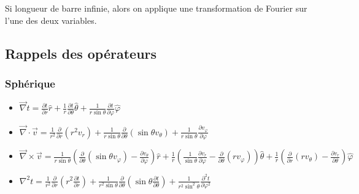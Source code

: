 \documentclass[../main.tex]{subfiles}
\begin{document}
Si longueur de barre infinie, alors on applique une transformation de Fourier sur l'une des deux variables.\\

\subsection{Rappels des opérateurs}
\subsubsection{Sphérique}
\begin{itemize}
    \item $\Vec{\nabla} t = \frac{\partial t}{\partial r} \hat{r} + \frac{1}{r} \frac{\partial t}{\partial \theta} \hat{\theta} + \frac{1}{r\sin{\theta}} \frac{\partial t}{\partial \varphi} \hat{\varphi}$\\
    \item $\Vec{\nabla} \cdot \Vec{v} = \frac{1}{r^2} \frac{\partial}{\partial r}(r^2 v_r) + \frac{1}{r\sin{\theta}} \frac{\partial}{\partial \theta}(\sin{\theta} v_{\theta}) + \frac{1}{r\sin{\theta}} \frac{\partial v_\varphi}{\partial \varphi}$\\
    \item $\Vec{\nabla}\times \Vec{v} = \frac{1}{r\sin{\theta}}(\frac{\partial}{\partial \theta} (\sin{\theta} v_\varphi) - \frac{\partial v_\theta}{\partial \varphi})\hat{r} + \frac{1}{r}(\frac{1}{\sin{\theta}} \frac{\partial v_r}{\partial \varphi} - \frac{\partial}{\partial \theta}(r v_\varphi))\hat{\theta} + \frac{1}{r}(\frac{\partial}{\partial r} (r v_\theta) - \frac{\partial v_r}{\partial \theta})\hat{\varphi}$\\
    \item $\nabla^2 t = \frac{1}{r^2} \frac{\partial}{\partial r}(r^2 \frac{\partial t}{\partial r}) + \frac{1}{r^2 \sin{\theta}} \frac{\partial}{\partial \theta}(\sin{\theta} \frac{\partial t}{\partial \theta}) + \frac{1}{r^2\sin^2\theta} \frac{\partial^2 t}{\partial \varphi^2}$\\
\end{itemize}
\end{document}
